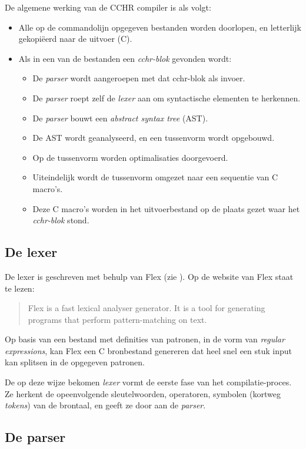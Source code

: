 De algemene werking van de CCHR compiler is als volgt: \begin{itemize}
  \item Alle op de commandolijn opgegeven bestanden worden doorlopen, en letterlijk gekopi\"eerd naar de uitvoer (C).
  \item Als in een van de bestanden een {\em cchr-blok} gevonden wordt: \begin{itemize}
    \item De {\em parser} wordt aangeroepen met dat cchr-blok als invoer.
    \item De {\em parser} roept zelf de {\em lexer} aan om syntactische elementen te herkennen.
    \item De {\em parser} bouwt een {\em abstract syntax tree} (AST).
    \item De AST wordt geanalyseerd, en een tussenvorm wordt opgebouwd.
    \item Op de tussenvorm worden optimalisaties doorgevoerd.
    \item Uiteindelijk wordt de tussenvorm omgezet naar een sequentie van C macro's.
    \item Deze C macro's worden in het uitvoerbestand op de plaats gezet waar het {\em cchr-blok} stond.
  \end{itemize}
\end{itemize}

\subsection{De lexer} \label{sec:lexer}

De lexer is geschreven met behulp van Flex (zie \cite{flex}). Op de website van Flex staat te lezen: \begin{quote}
  Flex is a fast lexical analyser generator. It is a tool for generating programs that perform pattern-matching on text.
\end{quote}

Op basis van een bestand met definities van patronen, in de vorm van {\em regular expressions}, kan Flex een C bronbestand genereren dat heel snel een stuk input kan splitsen in de opgegeven patronen. 

De op deze wijze bekomen {\em lexer} vormt de eerste fase van het compilatie-proces. Ze herkent de opeenvolgende sleutelwoorden, operatoren, symbolen (kortweg {\em tokens}) van de brontaal, en geeft ze door aan de {\em parser}.

\subsection{De parser} \label{sec:parser}

